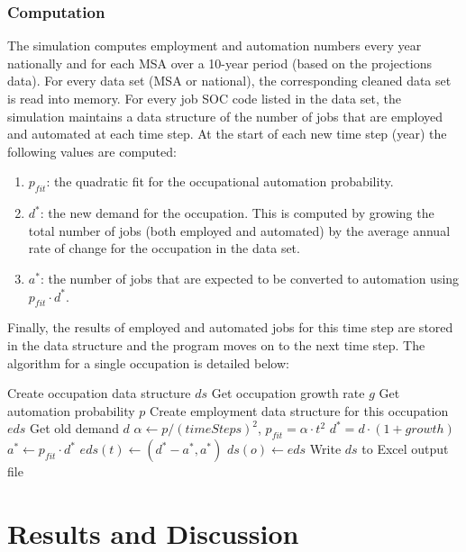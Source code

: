 \documentclass[10pt]{article}
\begin{document}
\subsubsection{Computation}
The simulation computes employment and automation numbers every year nationally and for each MSA over a 10-year period (based on the projections data). For every data set (MSA or national), the corresponding cleaned data set is read into memory. For every job SOC code listed in the data set, the simulation maintains a data structure of the number of jobs that are employed and automated at each time step. At the start of each new time step (year) the following values are computed:
\begin{enumerate}
    \item $p_{fit}$: the quadratic fit for the occupational automation probability.
    \item $d^*$: the new demand for the occupation. This is computed by growing the total number of jobs (both employed and automated) by the average annual rate of change for the occupation in the data set.
    \item $a^*$: the number of jobs that are expected to be converted to automation using $p_{fit} \cdot d^*$.
\end{enumerate}
Finally, the results of employed and automated jobs for this time step are stored in the data structure and the program moves on to the next time step. The algorithm for a single occupation is detailed below:
\begin{algorithm}[H]
\begin{algorithmic}[1]

    \State Create occupation data structure $ds$
        \State Get occupation growth rate $g$
        \State Get automation probability $p$
        \State Create employment data structure for this occupation $eds$
            \State Get old demand $d$
            \State $\alpha \leftarrow p/(timeSteps)^2$, $p_{fit}=\alpha\cdot t^2$
            \State $d^*=d\cdot(1+growth)$
            \State $a^* \leftarrow p_{fit}\cdot d^*$
            \State $eds(t) \leftarrow (d^* - a^*, a^*)$
        \EndFor
        \State $ds(o) \leftarrow eds$
    \EndFor
    \State Write $ds$ to Excel output file
\EndProcedure

\end{algorithmic}
\end{algorithm}

\section{Results and Discussion}
\end{document}

